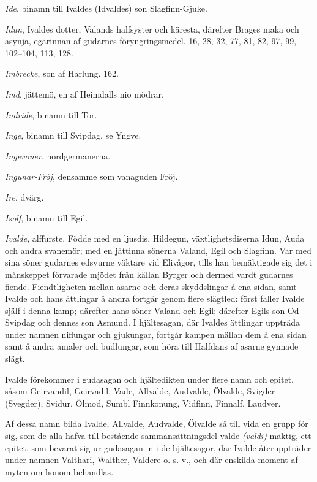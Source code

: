 \emph{Ide}, binamn till Ivaldes (Idvaldes) son Slagfinn-Gjuke.

\emph{Idun}, Ivaldes dotter, Valands halfsyster och käresta, därefter
Brages maka och asynja, egarinnan af gudarnes föryngringsmedel. 16, 28,
32, 77, 81, 82, 97, 99, 102--104, 113, 128.

\emph{Imbrecke}, son af Harlung. 162.

\emph{Imd}, jättemö, en af Heimdalls nio mödrar.

\emph{Indride}, binamn till Tor.

\emph{Inge}, binamn till Svipdag, se Yngve.

\emph{Ingevoner}, nordgermanerna.

\emph{Ingunar-Fröj}, densamme som vanaguden Fröj.

\emph{Ire}, dvärg.

\emph{Isolf}, binamn till Egil.

\emph{Ivalde}, alffurste. Födde med en ljusdis, Hildegun,
växtlighetsdiserna Idun, Auda och andra svanemör; med en jättinna
sönerna Valand, Egil och Slagfinn. Var med sina söner gudarnes edsvurne
väktare vid Elivågor, tills han bemäktigade sig det i månskeppet
förvarade mjödet från källan Byrger och dermed vardt gudarnes fiende.
Fiendtligheten mellan asarne och deras skyddslingar å ena sidan, samt
Ivalde och hans ättlingar å andra fortgår genom flere slägtled: först
faller Ivalde själf i denna kamp; därefter hans söner Valand och Egil;
därefter Egils son Od-Svipdag och dennes son Asmund. I hjältesagan, där
Ivaldes ättlingar uppträda under namnen niflungar och gjukungar, fortgår
kampen mällan dem å ena sidan samt å andra amaler och budlungar, som
höra till Halfdans af asarne gynnade slägt.

Ivalde förekommer i gudasagan och hjältedikten under flere namn och
epitet, såsom Geirvandil, Geirvadil, Vade, Allvalde, Audvalde, Ölvalde,
Svigder (Svegder), Svidur, Ölmod, Sumbl Finnkonung, Vidfinn, Finnalf,
Laudver.

Af dessa namn bilda Ivalde, Allvalde, Audvalde, Ölvalde så till vida en
grupp för sig, som de alla hafva till bestående sammansättningsdel valde
\emph{(valdi)} mäktig, ett epitet, som bevarat sig ur gudasagan in i de
hjältesagor, där Ivalde återuppträder under namnen Valthari,
Walther\protect\hypertarget{lb1625905.xhtmlux5cux23start226}{}{}\protect\hypertarget{lb1625905.xhtmlux5cux23start226-a}{}{}\protect\hypertarget{lb1625905.xhtmlux5cux23start226-b}{}{}\protect\hypertarget{lb1625905.xhtmlux5cux23start226-c}{}{}\protect\hypertarget{lb1625905.xhtmlux5cux23start226-d}{}{},
Valdere o. s. v., och där enskilda moment af myten om honom behandlas.

